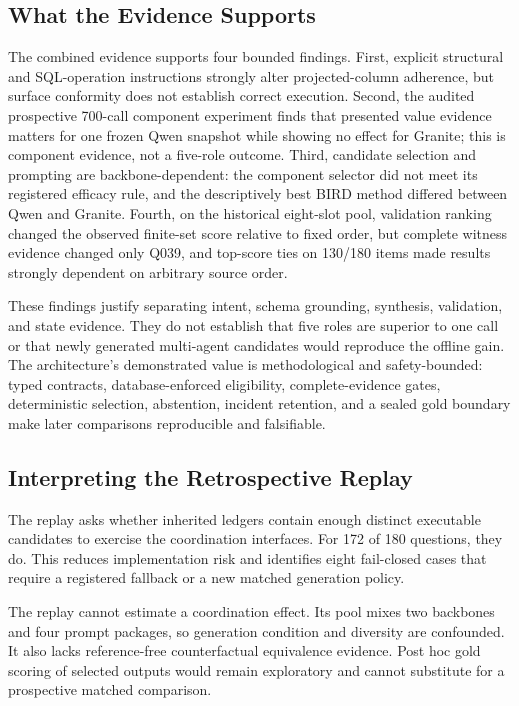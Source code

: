 \documentclass[applsci,article,submit,moreauthors]{Definitions/mdpi}
\begin{document}
\subsection{What the Evidence Supports}

The combined evidence supports four bounded findings. First, explicit structural and SQL-operation instructions strongly alter projected-column adherence, but surface conformity does not establish correct execution. Second, the audited prospective 700-call component experiment finds that presented value evidence matters for one frozen Qwen snapshot while showing no effect for Granite; this is component evidence, not a five-role outcome. Third, candidate selection and prompting are backbone-dependent: the component selector did not meet its registered efficacy rule, and the descriptively best BIRD method differed between Qwen and Granite. Fourth, on the historical eight-slot pool, validation ranking changed the observed finite-set score relative to fixed order, but complete witness evidence changed only Q039, and top-score ties on 130/180 items made results strongly dependent on arbitrary source order.

These findings justify separating intent, schema grounding, synthesis, validation, and state evidence. They do not establish that five roles are superior to one call or that newly generated multi-agent candidates would reproduce the offline gain. The architecture's demonstrated value is methodological and safety-bounded: typed contracts, database-enforced eligibility, complete-evidence gates, deterministic selection, abstention, incident retention, and a sealed gold boundary make later comparisons reproducible and falsifiable.

\subsection{Interpreting the Retrospective Replay}

The replay asks whether inherited ledgers contain enough distinct executable candidates to exercise the coordination interfaces. For 172 of 180 questions, they do. This reduces implementation risk and identifies eight fail-closed cases that require a registered fallback or a new matched generation policy.

The replay cannot estimate a coordination effect. Its pool mixes two backbones and four prompt packages, so generation condition and diversity are confounded. It also lacks reference-free counterfactual equivalence evidence. Post hoc gold scoring of selected outputs would remain exploratory and cannot substitute for a prospective matched comparison.
\end{document}
